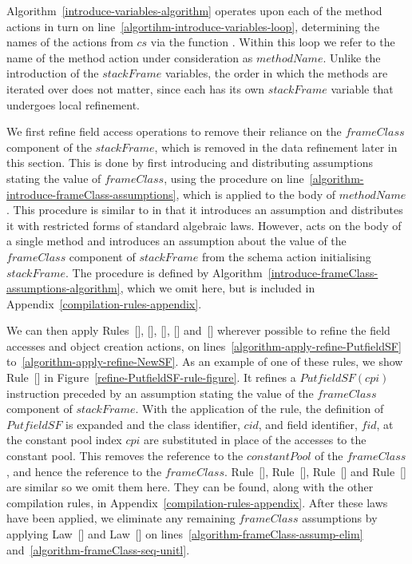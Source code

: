 Algorithm~\ref{introduce-variables-algorithm} operates upon each of
the method actions in turn on
line~\ref{algortihm-introduce-variables-loop}, determining the names
of the actions from $cs$ via the function .
Within this loop we refer to the name of the method action under
consideration as $methodName$.
Unlike the introduction of the $stackFrame$ variables, the order in
which the methods are iterated over does not matter, since each has
its own $stackFrame$ variable that undergoes local refinement.

We first refine field access operations to remove their reliance on
the $frameClass$ component of the $stackFrame$, which is removed in
the data refinement later in this section.
This is done by first introducing and distributing assumptions stating
the value of $frameClass$, using the procedure
 on
line~\ref{algorithm-introduce-frameClass-assumptions}, which is
applied to the body of $methodName$.
This procedure is similar to 
in that it introduces an assumption and distributes it with restricted
forms of standard algebraic laws.
However,  acts on the body of a
single method and introduces an assumption about the value of the
$frameClass$ component of $stackFrame$ from the schema action
initialising $stackFrame$.
The  procedure is defined by
Algorithm~\ref{introduce-frameClass-assumptions-algorithm}, which we
omit here, but is included in
Appendix~\ref{compilation-rules-appendix}.

We can then apply Rules~[],
[],
[],
[] and~[]
wherever possible to refine the field accesses and object creation
actions, on lines~\ref{algorithm-apply-refine-PutfieldSF}
to~\ref{algorithm-apply-refine-NewSF}.
As an example of one of these rules, we show
Rule~[] in
Figure~\ref{refine-PutfieldSF-rule-figure}.
It refines a $PutfieldSF(cpi)$ instruction preceded by an assumption
stating the value of the $frameClass$ component of $stackFrame$.
With the application of the rule, the definition of $PutfieldSF$ is
expanded and the class identifier, $cid$, and field identifier, $fid$,
at the constant pool index $cpi$ are substituted in place of the
accesses to the constant pool.
This removes the reference to the $constantPool$ of the $frameClass$,
and hence the reference to the $frameClass$.
Rule~[],
Rule~[],
Rule~[] and
Rule~[] are similar so we omit them here.
They can be found, along with the other compilation rules, in
Appendix~\ref{compilation-rules-appendix}.
After these laws have been applied, we eliminate any remaining
$frameClass$ assumptions by applying Law~[]
and Law~[] on
lines~\ref{algorithm-frameClass-assump-elim}
and~\ref{algorithm-frameClass-seq-unitl}.

